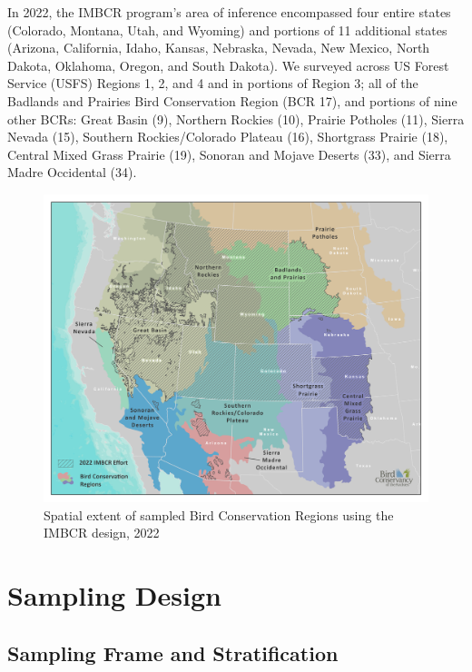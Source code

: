 \documentclass[
  letterpaper,
  DIV=11,
  numbers=noendperiod,
  oneside]{scrreprt}
\begin{document}
In 2022, the IMBCR program's area of inference encompassed four entire
states (Colorado, Montana, Utah, and Wyoming) and portions of 11
additional states (Arizona, California, Idaho, Kansas, Nebraska, Nevada,
New Mexico, North Dakota, Oklahoma, Oregon, and South Dakota). We
surveyed across US Forest Service (USFS) Regions 1, 2, and 4 and in
portions of Region 3; all of the Badlands and Prairies Bird Conservation
Region (BCR 17), and portions of nine other BCRs: Great Basin (9),
Northern Rockies (10), Prairie Potholes (11), Sierra Nevada (15),
Southern Rockies/Colorado Plateau (16), Shortgrass Prairie (18), Central
Mixed Grass Prairie (19), Sonoran and Mojave Deserts (33), and Sierra
Madre Occidental (34).

\begin{figure}

{\centering \includegraphics{./IMBCR_Extent_Map_2022.png}

}

\caption{\label{fig-extent}Spatial extent of sampled Bird Conservation
Regions using the IMBCR design, 2022}

\end{figure}

\hypertarget{sampling-design}{%
\section{Sampling Design}\label{sampling-design}}

\hypertarget{sampling-frame-and-stratification}{%
\subsection{Sampling Frame and
Stratification}\label{sampling-frame-and-stratification}}
\end{document}
